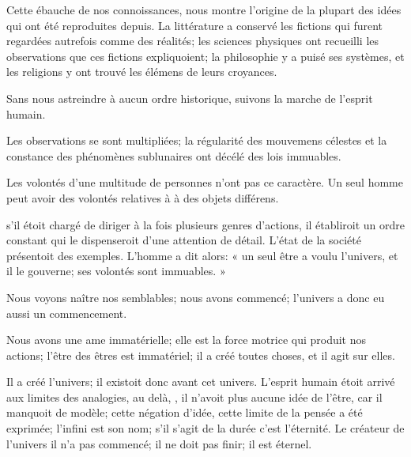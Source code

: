 \documentclass[11pt,a4paper]{article}
\begin{document}
 Cette  ébauche de nos
connoissances, nous montre l'origine  de la
plupart des idées qui ont été reproduites depuis. La littérature a
conservé les fictions qui furent regardées autrefois comme des
réalités; les sciences physiques ont recueilli les observations que
ces fictions  expliquoient; la philosophie y a
puisé ses systèmes, et les religions y ont trouvé les élémens de leurs
croyances.

Sans nous astreindre à aucun ordre historique, suivons la marche de
l'esprit humain.

Les observations se sont multipliées; la régularité des mouvemens
célestes et la constance des phénomènes sublunaires ont décélé des lois
immuables. \struck{\ill{}}

Les volontés d'une multitude de personnes n'ont pas ce caractère.
 Un seul homme peut avoir des volontés relatives à
 à des objets différens.

s'il étoit chargé de diriger à la fois plusieurs genres d'actions, il
établiroit un ordre constant qui le dispenseroit d'une attention de
détail. L'état de la société présentoit des  exemples. L'homme a dit alors: « un seul être a voulu
l'univers, et il le gouverne; ses volontés sont immuables. »

Nous voyons naître nos semblables; nous avons commencé; l'univers a
donc eu aussi un commencement.

Nous avons une ame immatérielle; elle est la force motrice qui produit
nos actions; l'être des êtres est immatériel; il a créé toutes choses,
et il  agit sur elles.

Il a créé l'univers; il existoit donc avant cet univers. L'esprit
humain étoit arrivé aux limites des analogies, au delà, , il n'avoit plus aucune idée de l'être, car il
manquoit de modèle; cette négation d'idée, cette limite de la pensée a
été exprimée; l'infini est son nom; s'il s'agit de la durée c'est
l'éternité. Le créateur de l'univers 
 il n'a pas commencé; il ne doit pas finir;
il est éternel.
\end{document}
